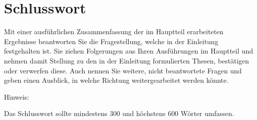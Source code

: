\part{Schlusswort}
Mit einer ausführlichen Zusammenfassung der im Hauptteil erarbeiteten Ergebnisse beantworten Sie die Fragestellung, 
welche in der Einleitung festgehalten ist. Sie ziehen Folgerungen aus Ihren Ausführungen im Hauptteil und nehmen damit
 Stellung zu den in der Einleitung formulierten Thesen, bestätigen oder verwerfen diese. Auch nennen Sie weitere, nicht 
 beantwortete Fragen und geben einen Ausblick, in welche Richtung weitergearbeitet werden könnte. 

Hinweis:

Das Schlusswort sollte mindestens 300 und höchstens 600 Wörter umfassen.
